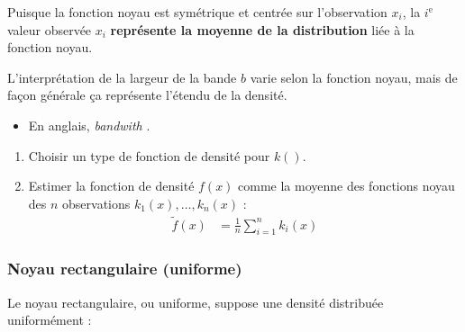 \documentclass[french]{article}
\begin{document}
\begin{multicols*}{2}
\begin{definitionNOHFILLsub}
\begin{rappel_enhanced}[Contexte]
Puisque la fonction noyau est symétrique et centrée sur l'observation $x_{i}$, la $i^{\text{e}}$ valeur observée $x_{i}$ \textbf{représente la moyenne de la distribution} liée à la fonction noyau.
\end{rappel_enhanced}
\end{definitionNOHFILLsub}

\begin{definitionNOHFILLsub}
L'interprétation de la largeur de la bande $b$ varie selon la fonction noyau, mais de façon générale ça représente l'étendu de la densité.

\bigskip

\begin{itemize}
	\item	En anglais, \og \textit{bandwith} \fg{}.
\end{itemize}
\end{definitionNOHFILLsub}

	
\begin{definitionNOHFILLprop}
\begin{enumerate}[label = \circled{\arabic*}{trueblue}]
	\item	Choisir un type de fonction de densité pour $k()$.
	\item	Estimer la fonction de densité $f(x)$ comme la moyenne des fonctions noyau des $n$ observations $k_{1}(x), \dots, k_{n}(x)$ : 
		\begin{align*}
		\tilde{f}(x)
		&=	\frac{1}{n} \sum_{i = 1}^{n} k_{i}(x)
		\end{align*}
\end{enumerate}
\end{definitionNOHFILLprop}
	

\subsubsection{Noyau rectangulaire (uniforme)}
\begin{definitionNOHFILLsub}
Le noyau rectangulaire, ou uniforme, suppose une densité distribuée uniformément : 
\begin{center}
\begin{tikzpicture}[x=0.75pt,y=0.75pt,yscale=-1,xscale=1]


\end{tikzpicture}
\end{center}
\end{definitionNOHFILLsub}
\end{multicols*}
\end{document}
